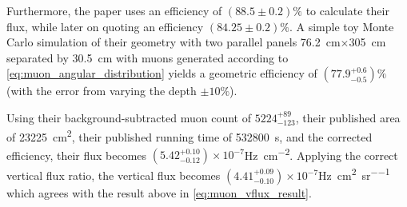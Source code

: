 \documentclass[herrin-thesis.tex]{subfiles}
\begin{document}
Furthermore, the paper uses an efficiency of \((88.5\pm0.2)\%\) to calculate their flux, while later on quoting an efficiency \((84.25\pm0.2)\%\). A simple toy Monte Carlo simulation of their geometry with two parallel panels \SI{76.2}{\cm}\(\times\)\SI{305}{\cm} separated by \SI{30.5}{cm} with muons generated according to \cref{eq:muon_angular_distribution} yields a geometric efficiency of \((77.9^{+0.6}_{-0.5})\%\) (with the error from varying the depth \(\pm10\%\)).

Using their background-subtracted muon count of \(5224^{+89}_{-123}\), their published area of \SI{23225}{\square\cm}, their published running time of \SI{532800}{s}, and the corrected efficiency, their flux becomes \((5.42^{+0.10}_{-0.12})\times10^{-7}\)\si{\Hz\per\square\cm}. Applying the correct vertical flux ratio, the vertical flux becomes \((4.41^{+0.09}_{-0.10})\times10^{-7}\)\si{\Hz\per\square\cm\per\steradian} which agrees with the result above in \cref{eq:muon_vflux_result}.

%
%
\end{document}
